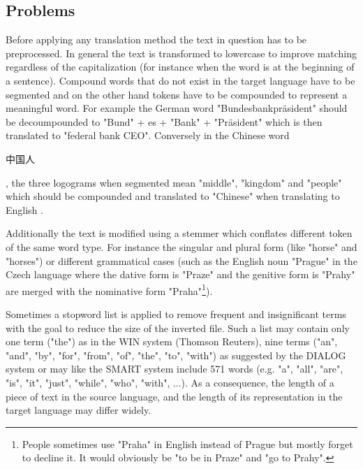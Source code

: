 \documentclass[journal]{IEEEtran}
\begin{document}
\subsection{Problems}
Before applying any translation method the text in question has to be preprocessed.
In general the text is transformed to lowercase to improve matching regardless of the capitalization (for instance when the word is at the beginning of a sentence).
Compound words that do not exist in the target language have to be segmented and on the other hand tokens have to be compounded to represent a meaningful word.
For example the German word "Bundesbankpr\"{a}sident" should be decoumpounded to "Bund" + es + "Bank" + "Pr\"{a}sident" which is then translated to "federal bank CEO".
Conversely in the Chinese word \begin{CJK}{UTF8}{gbsn}中国人\end{CJK}, the three logograms when segmented mean "middle", "kingdom" and "people" which should be compounded and translated to "Chinese" when translating to English \cite{ir13}.

Additionally the text is modified using a stemmer which conflates different token of the same word type.
For instance the singular and plural form (like "horse" and "horses") or different grammatical cases (such as the English noun "Prague" in the Czech language where the dative form is "Praze" and the genitive form is "Prahy" are merged with the nominative form "Praha"\footnote{People sometimes use "Praha" in English instead of Prague but mostly forget to decline it.
It would obviously be "to be in Praze" and "go to Prahy".}).

Sometimes a stopword list is applied to remove frequent and insignificant terms with the goal to reduce the size of the inverted file.
Such a list may contain only one term ("the") as in the WIN system (Thomson Reuters), nine terms ("an", "and", "by", "for", "from", "of", "the", "to", "with") as suggested by the DIALOG system or may like the SMART system include 571 words (e.g. "a", "all", "are", "is", "it", "just", "while", "who", "with", ...).
As a consequence, the length of a piece of text in the source language, and the length of its representation in the target language may differ widely.
\end{document}
